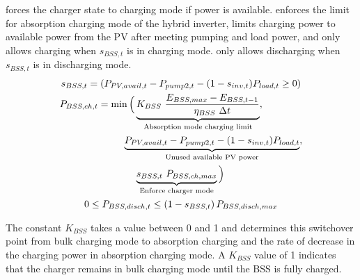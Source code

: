  forces the charger state to charging mode if power is available.
 enforces the limit for absorption charging mode of the hybrid inverter,
limits charging power to available power from the PV after meeting pumping and load power,
and only allows charging when $s_{BSS,t}$ is in charging mode.
 only allows discharging when $s_{BSS,t}$ is in discharging mode.
%
\begin{gather}
\label{eqn:sBSS}
s_{BSS,t} = \left( P_{PV,avail,t} - P_{pump2,t} - (1 - s_{inv,t}) P_{load,t} \ge 0 \right)
\\
\label{eqn:BSS-mode-charging}
\begin{aligned}
P_{BSS,ch,t} = \min\Big(
& \underbrace{K_{BSS} \ \frac{E_{BSS,max} - E_{BSS,t-1}}{\eta_{BSS} \ \Delta t}}_
{\textrm{Absorption mode charging limit}},
\\
& \mkern-22mu \underbrace{P_{PV,avail,t} - P_{pump2,t} - (1 - s_{inv,t}) P_{load,t}}_
{\textrm{Unused available PV power}},
\\
& \underbrace{s_{BSS,t} \ P_{BSS,ch,max}}_  
{\textrm{Enforce charger mode}} \Big)
\end{aligned}
\\
\label{eqn:BSS-mode-discharging}
0 \le P_{BSS,disch,t} \le \left(1 - s_{BSS,t}\right) P_{BSS,disch,max}
\end{gather}

The constant $K_{BSS}$ takes a value between 0 and 1 and determines this switchover point from bulk charging mode to absorption charging and the rate of decrease in the charging power in absorption charging mode. A $K_{BSS}$ value of 1 indicates that the charger remains in bulk charging mode until the BSS is fully charged.
%

